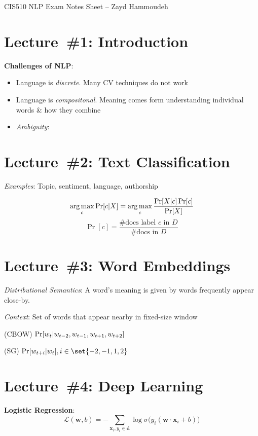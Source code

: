 \documentclass[9pt]{extarticle}
\begin{document}
\begin{center}
CIS510 NLP Exam Notes Sheet -- Zayd Hammoudeh
\end{center}
\begin{multicols}{3}
  \section*{Lecture~\#1: Introduction}

  \textbf{Challenges of NLP}:
  \begin{itemize}
    \item Language is \textit{discrete}. Many CV techniques do not work
    \item Language is \textit{compositonal}. Meaning comes form understanding individual words \& how they combine
    \item \textit{Ambiguity}:
  \end{itemize}

  \section*{Lecture~\#2: Text Classification}
  \textit{Examples}: Topic, sentiment, language, authorship

  \begin{equation*}\label{eq:L02:NaiveBayes}
    \operatorname*{arg\,max}_c \Pr\lbrack c \vert X\rbrack = \operatorname*{arg\,max}_{c} \frac{\Pr[X \vert c] \Pr[c]}{\Pr[X]}
  \end{equation*}
  \begin{equation*}\label{eq:L02:Bernoulli}
    \Pr[c] = \frac{\text{\#docs label } c \text{ in } D}{\text{\#docs in } D}
  \end{equation*}

  \section*{Lecture~\#3: Word Embeddings}
  \textit{Distributional Semantics}: A word's meaning is given by words frequently appear close-by.

  \textit{Context}: Set of words that appear nearby in fixed-size window

  \textbf{} (CBOW) ${\Pr\lbrack w_t \vert w_{t-2}, w_{t-1}, w_{t+1}, w_{t+2}\rbrack}$

  \textbf{} (SG) ${\Pr\sbrack{w_{t+i} \vert w_{t}}, i \in \set{-2,-1,1,2}}$

  \section*{Lecture~\#4: Deep Learning}
  \textbf{Logistic Regression}:
  \begin{equation*}\label{eq:L04:LogReg}
    \mathcal{L}(\mathbf{w},b) = -\sum_{\mathbf{x}_i,y_i \in \mathbf{d}} \log \sigma\big( y_i(\mathbf{w}\cdot \mathbf{x}_i + b) \big)
  \end{equation*}

\end{multicols}
\end{document}
